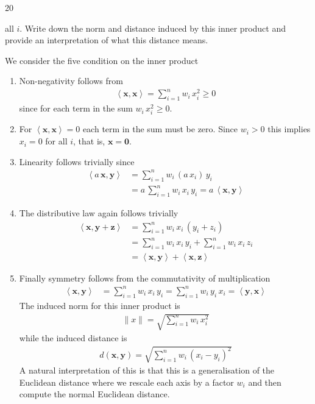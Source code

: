 \documentclass[answers]{sotonExamBoxes}    %
\newcommand{\len}[1]{\| #1 \|}
\newcommand{\inner}[2]{\left\langle #1, #2\right\rangle}
\begin{document}
\begin{question}{20}
\begin{qparts}
{      all $i$.  Write down the norm and distance induced by this
      inner product and provide an interpretation of what this
      distance means.}{}
    \begin{answer}
      We consider the five condition on the inner product
      \begin{enumerate}
      \item Non-negativity follows from
        \begin{align*}
          \inner{\bm{x}}{\bm{x}} = \sum_{i=1}^n w_i \, x_i ^2
          \geq 0
        \end{align*}
        since for each term in the sum $w_i \, x_i ^2\geq0$.
      \item For $ \inner{\bm{x}}{\bm{x}} = 0$ each term in the sum
        must be zero.  Since $w_i>0$ this implies $x_i=0$ for all $i$,
        that is, $\bm{x}=\bm{0}$.
      \item Linearity follows trivially since
        \begin{align*}
          \inner{a\,\bm{x}}{\bm{y}}
          &= \sum_{i=1}^n w_i \, (a\,x_i)  \,y_i \\
          &= a\, \sum_{i=1}^n w_i \, x_i \,y_i = a\,\inner{\bm{x}}{\bm{y}}
        \end{align*}
      \item The distributive law again follows trivially
        \begin{align*}
          \inner{\bm{x}}{\bm{y}+\bm{z}}
          &= \sum_{i=1}^n w_i \, x_i \,(y_i+z_i) \\
          &= \sum_{i=1}^n w_i \, x_i \,y_i + \sum_{i=1}^n w_i \, x_i \,z_i 
          \\
          &=   \inner{\bm{x}}{\bm{y}} +   \inner{\bm{x}}{\bm{z}}
        \end{align*}
      \item Finally symmetry follows from the commutativity of
        multiplication
        \begin{align*}
          \inner{\bm{x}}{\bm{y}} &=  \sum_{i=1}^n w_i \, x_i \,y_i
          =  \sum_{i=1}^n w_i \, y_i \,x_i =  \inner{\bm{y}}{\bm{x}} 
        \end{align*}
        The induced norm for this inner product is
        \begin{align*}
          \len{x} = \sqrt{\sum_{i=1}^n w_i \, x_i^2}
        \end{align*}
        while the induced distance is
        \begin{align*}
          d(\bm{x}, \bm{y}) = \sqrt{ \sum_{i=1}^n w_i \, (x_i-y_i)^2}
        \end{align*}
        A natural interpretation of this is that this is a
        generalisation of the Euclidean distance where we rescale each
        axis by a factor $w_i$ and then compute the normal Euclidean distance.
      \end{enumerate}
    \end{answer}
  \end{qparts}
  
\end{question}




\end{document}
